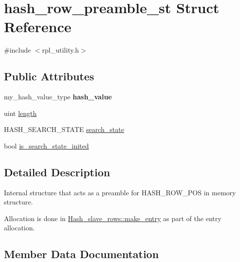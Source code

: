 \hypertarget{structhash__row__preamble__st}{}\section{hash\+\_\+row\+\_\+preamble\+\_\+st Struct Reference}
\label{structhash__row__preamble__st}


{\ttfamily \#include $<$rpl\+\_\+utility.\+h$>$}

\subsection*{Public Attributes}
\begin{DoxyCompactItemize}
\item 
\mbox{\label{structhash__row__preamble__st_a0114941da6375258b4de969db87b2264}} 
my\+\_\+hash\+\_\+value\+\_\+type {\bfseries hash\+\_\+value}
\item 
uint \mbox{\hyperlink{structhash__row__preamble__st_a5a17450dc10d7103def2123d9fccc27f}{length}}
\item 
H\+A\+S\+H\+\_\+\+S\+E\+A\+R\+C\+H\+\_\+\+S\+T\+A\+TE \mbox{\hyperlink{structhash__row__preamble__st_a8e3514148639e988c11c87b9ea601dc8}{search\+\_\+state}}
\item 
bool \mbox{\hyperlink{structhash__row__preamble__st_a289202252b109417bdd86d9ef79c5d44}{is\+\_\+search\+\_\+state\+\_\+inited}}
\end{DoxyCompactItemize}


\subsection{Detailed Description}
Internal structure that acts as a preamble for H\+A\+S\+H\+\_\+\+R\+O\+W\+\_\+\+P\+OS in memory structure.

Allocation is done in \mbox{\hyperlink{classHash__slave__rows_a5f6d6cf9561e924b1bb3585385a91d3a}{Hash\+\_\+slave\+\_\+rows\+::make\+\_\+entry}} as part of the entry allocation. 

\subsection{Member Data Documentation}
\mbox{\label{structhash__row__preamble__st_a289202252b109417bdd86d9ef79c5d44}} 
